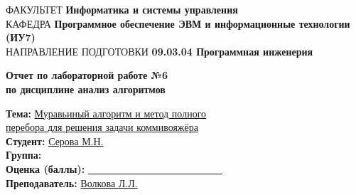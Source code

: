 \begin{titlepage}
	{\doublespacing \small \raggedright ФАКУЛЬТЕТ \hspace{2mm} \textbf{Информатика и системы управления}\\
		КАФЕДРА \hspace{2mm} \textbf{Программное обеспечение ЭВМ и информационные технологии (ИУ7)}\\
		НАПРАВЛЕНИЕ ПОДГОТОВКИ \hspace{2mm} \textbf{09.03.04 Программная инженерия}\\}
	
	
	\vspace{30mm}
	
	\begin{center}
			\centering
			\Large\textbf{  Отчет по лабораторной работе №6}\\
			\textbf{по дисциплине анализ алгоритмов}\\
	\end{center}
	\vspace{20mm}

	
	{\doublespacing\raggedright
		\textbf{Тема:} \hspace{27mm}\underline{Муравьиный алгоритм и метод полного}\\
		\hspace{43mm}\underline{перебора для решения задачи коммивояжёра}\\
		\textbf{Студент:} \hspace{17mm} \underline{Серова М.Н.}\\
		\textbf{Группа:} \hspace{21mm}\underline{}\\
		\textbf{Оценка (баллы):} \underline{~~~~~~~~~~~~~~~~~~~~~~~~~~~}\\
	\textbf{Преподаватель:} \hspace{2mm}\underline{Волкова Л.Л.}\\}
	


\end{titlepage}
